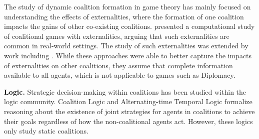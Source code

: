 The study of dynamic coalition formation in game theory has mainly focused on understanding the effects of externalities, where the formation of one coalition impacts the gains of other co-existing coalitions. \citep{rahwan2009coalition} presented a computational study of coalitional games with externalities, arguing that such externalities are common in real-world settings. The study of such externalities was extended by work including \citep{sklab2020coalition, skibski2016k, michalak2010logic}. While these approaches were able to better capture the impacts of externalities on other coalitions, they assume that complete information available to all agents, which is not applicable to games such as Diplomacy.
 

\textbf{Logic.} 
Strategic decision-making within coalitions has been studied within the logic community. Coalition Logic \citep{pauly2002modal} and Alternating-time Temporal Logic \citep{alur2002alternating} formalize reasoning about the existence of joint strategies for agents in coalitions to achieve their goals regardless of how the non-coalitional agents act. However, these logics only study static coalitions. 

